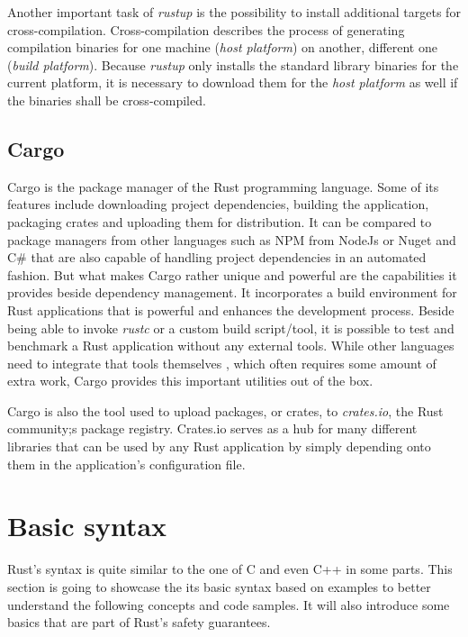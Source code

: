 Another important task of \textit{rustup} is the possibility to install additional targets for cross-compilation. Cross-compilation describes the process of generating compilation binaries for one machine (\textit{host platform}) on another, different one (\textit{build platform}). Because \textit{rustup} only installs the standard library binaries for the current platform, it is necessary to download them for the \textit{host platform} as well if the binaries shall be cross-compiled.

\subsection{Cargo}

Cargo is the package manager of the Rust programming language. Some of its features include downloading project dependencies, building the application, packaging crates and uploading them for distribution. It can be compared to package managers from other languages such as NPM from NodeJs or Nuget and C\# that are also capable of handling project dependencies in an automated fashion. But what makes Cargo rather unique and powerful are the capabilities it provides beside dependency management. It incorporates a build environment for Rust applications that is powerful and enhances the development process. Beside being able to invoke \textit{rustc} or a custom build script/tool, it is possible to test and benchmark a Rust application without any external tools. While other languages need to integrate that tools themselves , which often requires some amount of extra work, Cargo provides this important utilities out of the box.

Cargo is also the tool used to upload packages, or crates, to \textit{crates.io}, the Rust community;s package registry. Crates.io serves as a hub for many different libraries that can be used by any Rust application by simply depending onto them in the application's configuration file.

\section{Basic syntax}

Rust's syntax is quite similar to the one of C and even C++ in some parts. This section is going to showcase the its basic syntax based on examples to better understand the following concepts and code samples. It will also introduce some basics that are part of Rust's safety guarantees. 

